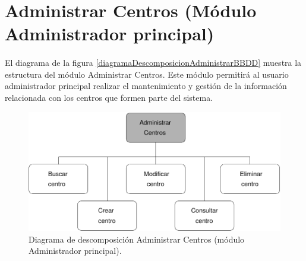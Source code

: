 \section{Administrar Centros (Módulo Administrador principal)}

  \paragraph{}El diagrama de la figura
  \ref{diagramaDescomposicionAdministrarBBDD} muestra la estructura del módulo
  Administrar Centros. Este módulo permitirá al usuario administrador principal
  realizar el mantenimiento y gestión de la información relacionada con los
  centros que formen parte del sistema.


  \begin{figure}[!ht]
    \begin{center}
      \includegraphics[]{11.Disenyo_Arquitectonico/11.2.Diagramas_Descomposicion/11.2.2.Modulo_administrador_principal/AdministrarBBDD/AdministrarCentros/Diagramas/administrar_centros.pdf}
      \caption{Diagrama de descomposición Administrar Centros (módulo Administrador principal).}
      \label{diagramaDescomposicionAdministrarCentros}
    \end{center}
  \end{figure}

